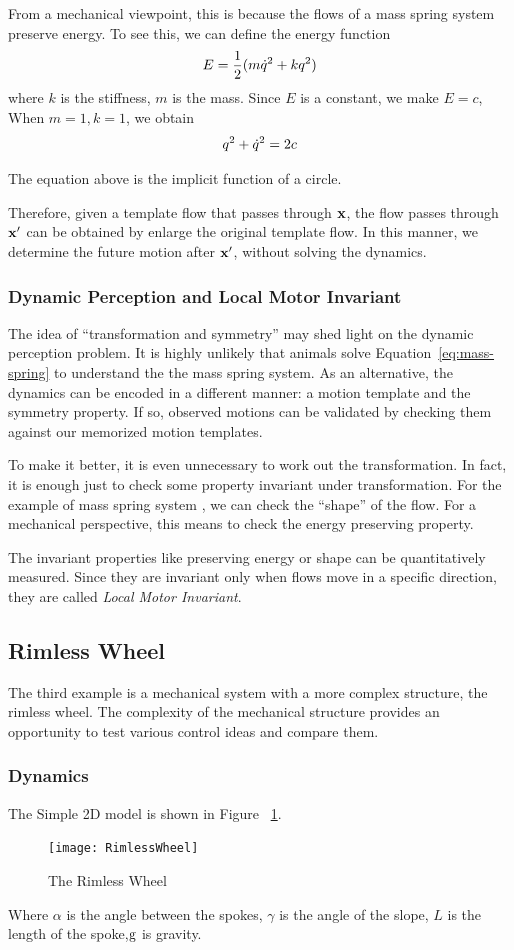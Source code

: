 From a mechanical viewpoint, this is because the flows of a mass spring system preserve energy.
To see this, we can define the energy function
\[
E=\frac{1}{2}(m\dot{q}^2+kq^2)
\]
where $k$ is the stiffness, $m$ is the mass.
Since $E$ is a constant, we make $E=c$,
When $m=1,k=1$, we obtain
\[
 q^2+\dot{q}^2=2c
\]
 
The equation above is the implicit function of a circle.

Therefore, given a template flow that passes through  $\mathbf{x}$, the flow passes through $\mathbf{x}'$  can be obtained by enlarge the original template flow.
In this manner, we determine the future motion after $\mathbf{x}'$, without solving the dynamics.


\subsubsection*{Dynamic Perception and Local Motor Invariant}

The idea of ``transformation and symmetry'' may shed light on the dynamic perception problem. 
It is highly unlikely that animals solve Equation~\ref{eq:mass-spring} to understand the the mass spring system.
As an alternative, the dynamics can be encoded in a different manner: a motion template and the symmetry property. 
If so, observed motions can be validated by checking them against our memorized motion templates.

To make it better, it is even unnecessary to work out the transformation.
In fact, it is enough just to check some property invariant under transformation.
For the example of mass spring system , we can check the ``shape'' of the flow.
For a mechanical perspective, this means to check the energy preserving property.

 
The invariant properties like preserving energy or shape can be quantitatively measured.
Since they are invariant only when flows move in a specific direction, they are called  \emph{Local Motor Invariant}. 


\subsection{Rimless Wheel}
The third example is a mechanical system with a more complex structure, the rimless wheel.
The complexity of the mechanical structure provides an opportunity to test various control ideas and compare them.

\subsubsection*{Dynamics}
The Simple 2D model is shown in Figure ~\ref{fig:rimlesswheel}. 
\begin{figure}[!htbp]
  \begin{center}
     \texttt{[image: RimlessWheel]}
    \caption{The Rimless Wheel}
    \label{fig:rimlesswheel}  
  \end{center}
\end{figure}
Where $\alpha$ is the angle between the spokes,  $\gamma$ is the angle of the slope,
$L$ is the length of the spoke,$\mathrm{g}$ is gravity.

